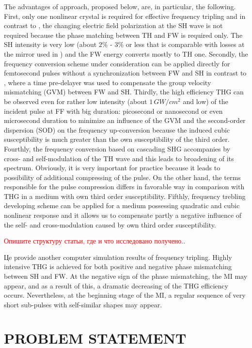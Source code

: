 \documentclass[a4paper, 12pt, onecolumn]{extarticle}
\begin{document}
The advantages of approach, proposed below, are, in particular, the following. First, only one nonlinear crystal is required for effective frequency tripling and in contrast to \cite{bib:t4}, the changing  electric field polarization at the SH wave is not required because the phase matching between TH and FW is required only. The SH intensity is very low (about $2\%$ - $3\%$ or less that is comparable with losses at the mirror used in \cite{bib:t4a,bib:t4}) and the FW energy converts mostly to TH one. Secondly, the frequency conversion scheme under consideration can be applied directly for femtosecond pulses without a synchronization between  FW and SH  in contrast to \cite{bib:t5}, where a time pre-delayer was used to compensate the group velocity mismatching (GVM) between FW and SH. Thirdly, the high efficiency THG can be observed even for rather low intensity (about \(1\,GW/cm^2\) and low) of the incident pulse at FF with big duration: picosecond or  nanosecond or  even microsecond duration to minimize an  influence of the GVM  and the second-order dispersion (SOD) on the frequency up-conversion because the induced cubic susceptibility is much greater than the own susceptibility of the third order.
Fourthly, the frequency conversion based on cascading SHG accompanies by cross- and self-modulation of the TH wave and this leads to broadening of its spectrum. Obviously, it is very important for practice because it leads to possibility of additional compressing of the pulse. On the other hand, the terms responsible for the pulse compression differs in favorable way in comparison with THG in a medium with own third order susceptibility. 
Fifthly,  frequency trebling developing scheme can be applied for a medium possessing quadratic and cubic nonlinear response and it allows us to compensate partly a negative influence of the self- and cross-modulation caused by own third order susceptibility. 

\textcolor{red}{ Опишите структуру статьи, где и что исследовано  получено.}.

Цe provide another computer simulation results of frequency tripling. Highly intensive THG is achieved for both positive and negative phase mismatching between SH and FW. At the negative sign of the phase mismatching, the MI may appear, and as a result of this, a dramatic decreasing of the THG efficiency occurs. Nevertheless, at the beginning stage of the MI, a regular sequence of very short sub-pulses with self-similar shapes may appear.

\section{PROBLEM STATEMENT}
\end{document}
